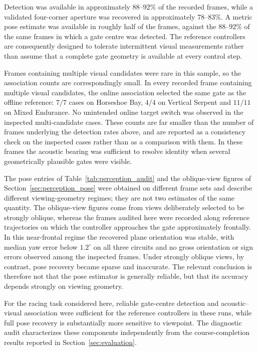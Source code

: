 


Detection was available in approximately $88$--$92\%$ of the recorded frames,
while a validated four-corner aperture was recovered in approximately
$78$--$83\%$. A metric pose estimate was available in roughly half of the
frames, against the $88$--$92\%$ of the same frames in which a gate centre was
detected. The reference controllers are consequently designed to tolerate
intermittent visual measurements rather than assume that a complete gate
geometry is available at every control step.

Frames containing multiple visual candidates were rare in this sample, so the
association counts are correspondingly small. In every recorded frame
containing multiple visual candidates, the online association selected the same
gate as the offline reference: $7/7$ cases on Horseshoe Bay, $4/4$ on Vertical
Serpent and $11/11$ on Mixed Endurance. No unintended online target switch was
observed in the inspected multi-candidate cases. These counts are far smaller
than the number of frames underlying the detection rates above, and are reported
as a consistency check on the inspected cases rather than as a comparison with
them. In these frames the acoustic bearing was sufficient to resolve identity
when several geometrically plausible gates were visible.

The pose entries of Table~\ref{tab:perception_audit} and the oblique-view
figures of Section~\ref{sec:perception_pose} were obtained on different frame
sets and describe different viewing-geometry regimes; they are not two estimates
of the same quantity. The oblique-view figures come from views deliberately
selected to be strongly oblique, whereas the frames audited here were recorded
along reference trajectories on which the controller approaches the gate
approximately frontally. In this near-frontal regime the recovered plane
orientation was stable, with median yaw error below
$1.2^\circ$ on all three circuits and no gross orientation or sign errors
observed among the inspected frames. Under strongly oblique views, by contrast,
pose recovery became sparse and inaccurate. The relevant conclusion is therefore
not that the pose estimator is generally reliable, but that its accuracy depends
strongly on viewing geometry.

For the racing task considered here, reliable gate-centre detection and
acoustic--visual association were sufficient for the reference controllers in
these runs, while full pose recovery is substantially more sensitive to
viewpoint. The diagnostic audit characterizes these components independently
from the course-completion results reported in Section~\ref{sec:evaluation}.
